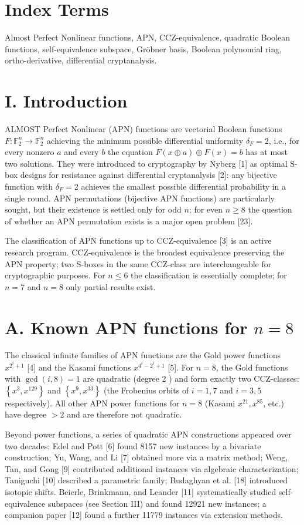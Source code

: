 \documentclass[10pt]{article}
\begin{document}
\section*{Index Terms}
Almost Perfect Nonlinear functions, APN, CCZ-equivalence, quadratic Boolean functions, self-equivalence subspace, Gröbner basis, Boolean polynomial ring, ortho-derivative, differential cryptanalysis.

\section*{I. Introduction}
ALMOST Perfect Nonlinear (APN) functions are vectorial Boolean functions $F: \mathbb{F}_{2}^{n} \rightarrow \mathbb{F}_{2}^{n}$ achieving the minimum possible differential uniformity $\delta_{F}=2$, i.e., for every nonzero $a$ and every $b$ the equation $F(x \oplus a) \oplus F(x)=b$ has at most two solutions. They were introduced to cryptography by Nyberg [1] as optimal S-box designs for resistance against differential cryptanalysis [2]: any bijective function with $\delta_{F}=2$ achieves the smallest possible differential probability in a single round. APN permutations (bijective APN functions) are particularly sought, but their existence is settled only for odd $n$; for even $n \geq 8$ the question of whether an APN permutation exists is a major open problem [23].

The classification of APN functions up to CCZ-equivalence [3] is an active research program. CCZ-equivalence is the broadest equivalence preserving the APN property; two S-boxes in the same CCZ-class are interchangeable for cryptographic purposes. For $n \leq 6$ the classification is essentially complete; for $n=7$ and $n=8$ only partial results exist.

\section*{A. Known APN functions for $n=8$}
The classical infinite families of APN functions are the Gold power functions $x^{2^{i}+1}$ [4] and the Kasami functions $x^{4^{i}-2^{i}+1}$ [5]. For $n=8$, the Gold functions with $\operatorname{gcd}(i, 8)=1$ are quadratic (degree 2 ) and form exactly two CCZ-classes: $\left\{x^{3}, x^{129}\right\}$ and $\left\{x^{9}, x^{33}\right\}$ (the Frobenius orbits of $i=1,7$ and $i=3,5$ respectively). All other APN power functions for $n=8$ (Kasami $x^{21}, x^{85}$, etc.) have degree $>2$ and are therefore not quadratic.

Beyond power functions, a series of quadratic APN constructions appeared over two decades: Edel and Pott [6] found 8157 new instances by a bivariate construction; Yu, Wang, and Li [7] obtained more via a matrix method; Weng, Tan, and Gong [9] contributed additional instances via algebraic characterization; Taniguchi [10] described a parametric family; Budaghyan et al. [18] introduced isotopic shifts. Beierle, Brinkmann, and Leander [11] systematically studied self-equivalence subspaces (see Section III) and found 12921 new instances; a companion paper [12] found a further 11779 instances via extension methods.
\end{document}
